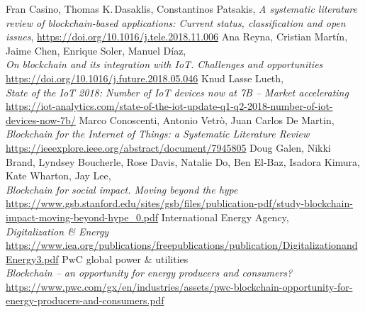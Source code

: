 \documentclass[11pt]{article}
\begin{document}
\begin{thebibliography}{11}

	Fran Casino, Thomas K.\,Dasaklis, Constantinos Patsakis,
	\textit{A systematic literature review of blockchain-based applications: Current status, classification and open issues},
	\hyperref[https://doi.org/10.1016/j.tele.2018.11.006]{https://doi.org/10.1016/j.tele.2018.11.006}
	Ana Reyna, Cristian Martín, Jaime Chen, Enrique Soler, Manuel Díaz,\\
	\textit{On blockchain and its integration with IoT. Challenges and opportunities}\\
	\hyperref[https://doi.org/10.1016/j.future.2018.05.046]{https://doi.org/10.1016/j.future.2018.05.046}
	Knud Lasse Lueth,\\
	\textit{State of the IoT 2018: Number of IoT devices now at 7B – Market accelerating}\\
	\hyperref[https://iot-analytics.com/state-of-the-iot-update-q1-q2-2018-number-of-iot-devices-now-7b/]{https://iot-analytics.com/state-of-the-iot-update-q1-q2-2018-number-of-iot-devices-now-7b/}
	Marco Conoscenti, Antonio Vetrò, Juan Carlos De Martin,\\
	\textit{Blockchain for the Internet of Things: a Systematic Literature Review}\\
	\hyperref[https://ieeexplore.ieee.org/abstract/document/7945805]{https://ieeexplore.ieee.org/abstract/document/7945805}
	Doug Galen, Nikki Brand, Lyndsey Boucherle, Rose Davis, Natalie Do, Ben El-Baz, Isadora Kimura, Kate Wharton, Jay Lee,\\
	\textit{Blockchain for social impact. Moving beyond the hype}\\
	\hyperref[https://www.gsb.stanford.edu/sites/gsb/files/publication-pdf/study-blockchain-impact-moving-beyond-hype_0.pdf]{https://www.gsb.stanford.edu/sites/gsb/files/publication-pdf/study-blockchain-impact-moving-beyond-hype\_0.pdf}
	International Energy Agency,\\
	\textit{Digitalization \& Energy}\\
	\hyperref[https://www.iea.org/publications/freepublications/publication/DigitalizationandEnergy3.pdf]{https://www.iea.org/publications/freepublications/publication/DigitalizationandEnergy3.pdf}
	PwC global power \& utilities\\
	\textit{Blockchain – an opportunity for energy producers and consumers?}\\
	\hyperref[https://www.pwc.com/gx/en/industries/assets/pwc-blockchain-opportunity-for-energy-producers-and-consumers.pdf]{https://www.pwc.com/gx/en/industries/assets/pwc-blockchain-opportunity-for-energy-producers-and-consumers.pdf}

\end{thebibliography}
\end{document}
